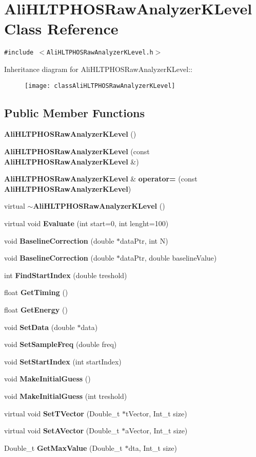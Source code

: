 \section{Ali\-HLTPHOSRaw\-Analyzer\-KLevel Class Reference}
\label{classAliHLTPHOSRawAnalyzerKLevel}
{\tt \#include $<$Ali\-HLTPHOSRaw\-Analyzer\-KLevel.h$>$}

Inheritance diagram for Ali\-HLTPHOSRaw\-Analyzer\-KLevel::\begin{figure}[H]
\begin{center}
\leavevmode
\texttt{[image: classAliHLTPHOSRawAnalyzerKLevel]}
\end{center}
\end{figure}
\subsection*{Public Member Functions}
\begin{CompactItemize}
\item 
{\bf Ali\-HLTPHOSRaw\-Analyzer\-KLevel} ()
\item 
{\bf Ali\-HLTPHOSRaw\-Analyzer\-KLevel} (const {\bf Ali\-HLTPHOSRaw\-Analyzer\-KLevel} \&)
\item 
{\bf Ali\-HLTPHOSRaw\-Analyzer\-KLevel} \& {\bf operator=} (const {\bf Ali\-HLTPHOSRaw\-Analyzer\-KLevel})
\item 
virtual {\bf $\sim$Ali\-HLTPHOSRaw\-Analyzer\-KLevel} ()
\item 
virtual void {\bf Evaluate} (int start=0, int lenght=100)
\item 
void {\bf Baseline\-Correction} (double $\ast$data\-Ptr, int N)
\item 
void {\bf Baseline\-Correction} (double $\ast$data\-Ptr, double baseline\-Value)
\item 
int {\bf Find\-Start\-Index} (double treshold)
\item 
float {\bf Get\-Timing} ()
\item 
float {\bf Get\-Energy} ()
\item 
void {\bf Set\-Data} (double $\ast$data)
\item 
void {\bf Set\-Sample\-Freq} (double freq)
\item 
void {\bf Set\-Start\-Index} (int start\-Index)
\item 
void {\bf Make\-Initial\-Guess} ()
\item 
void {\bf Make\-Initial\-Guess} (int treshold)
\item 
virtual void {\bf Set\-TVector} (Double\_\-t $\ast$t\-Vector, Int\_\-t size)
\item 
virtual void {\bf Set\-AVector} (Double\_\-t $\ast$a\-Vector, Int\_\-t size)
\item 
Double\_\-t {\bf Get\-Max\-Value} (Double\_\-t $\ast$dta, Int\_\-t size)
\end{CompactItemize}
